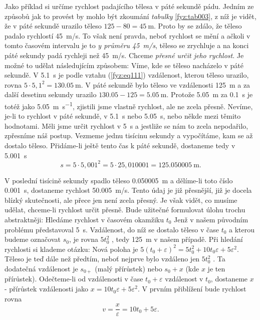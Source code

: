     Jako příklad si určíme rychlost padajícího tělesa v páté sekundě pádu. Jedním ze způsobů jak to 
    provést by mohlo být zkoumání \emph{tabulky} \ref{fyz:tab003}, z níž je vidět, že v páté 
    sekundě urazilo těleso \(125 - 80 = \SI{45}{\m}\). Proto by se zdálo, že těleso padalo 
    rychlostí \SI{45}{\m/\s}. To však není pravda, neboť rychlost se mění a ačkoli v tomto časovém 
    intervalu je to \emph{y průměru \SI{45}{\m/\s}}, těleso se zrychluje a na konci páté sekundy 
    padá rychleji než \SI{45}{\m/\s}. Chceme \emph{přesné určit jeho rychlost}. Je možné to udělat 
    následujícím způsobem: Víme, kde se těleso nacházelo v páté sekundě. V \SI{5.1}{\s} je podle 
    vztahu (\ref{fyz:eq111}) vzdálenost, kterou těleso urazilo, rovna \(5\cdot5,1^2 = \SI{130.05} 
    {\m}\). V páté sekundě bylo těleso ve vzdálenosti \SI{125}{\m} a za další desetinu sekundy 
    urazilo \(\num{130.05} - \num{125} = \SI{5.05}{\m}\). Protože \SI{5.05}{\m} za \SI{0.1}{\s} je 
    totéž jako \SI{5.05}{\m\per\s}, zjistili jsme vlastně rychlost, ale ne zcela přesně. Nevíme, 
    je-li to rychlost v páté sekundě, v \SI{5.1}{\s} nebo \SI{5.05}{\s}, nebo někde mezi těmito 
    hodnotami. Měli jsme určit rychlost v \SI{5}{\s} a jestliže se nám to zcela nepodařilo, 
    zpřesníme náš postup. Vezmeme jednu tisícinu sekundy a vypočítáme, kam se až dostalo těleso. 
    Přidáme-li ještě tento čas k páté sekundě, dostaneme tedy v \SI{5.001}{\s}
    \begin{equation*}
      s = 5\cdot5,001^2 = 5\cdot25,010001 = \SI{125.050005}{\m}.
    \end{equation*}
    
    V poslední tisícině sekundy spadlo těleso \SI{0.050005}{\m} a dělíme-li toto číslo 
    \SI{0.001}{\s}, dostaneme rychlost \SI{50.005}{\m/\s}. Tento údaj je již přesnější, již je 
    docela blízký skutečnosti, ale přece jen není zcela přesný. Je však vidět, co musíme udělat, 
    chceme-li rychlost určit přesně. Bude užitečné formulovat úlohu trochu abstraktněji: Hledáme 
    rychlost v časovém okamžiku \(t_0\) Jenž v našem původním problému představoval \SI{5}{\s}. 
    Vzdálenost, do níž se dostalo těleso v čase \(t_0\) a kterou budeme označovat \(s_0\), je rovna 
    \(5t_0^2\) , tedy \SI{125}{\m} v našem případě. Při hledání rychlosti si klademe otázku: 
     Nová poloha 
    je \(5(t_0 + \varepsilon)^2 = 5t_0^2 + 10t_0\varepsilon + 5\varepsilon^2\). Těleso je teď dále 
    než předtím, neboť nejprve bylo vzdáleno jen \(5t_0^2\) . Ta dodatečná vzdálenost je \(s_{0+}\) 
    (malý přírůstek) nebo \(s_0 + x\) (kde \(x\) je ten přírůstek). Odečteme-li od vzdálenosti 
    v čase \(t_0 + \varepsilon\) vzdálenost v \(t_0\), dostaneme \(x\) - přírůstek vzdálenosti jako 
    \(x = 10t_0\varepsilon +5\varepsilon^2\). V prvním přiblížení bude rychlost rovna
    \begin{equation}\label{fyz:eq116}
      v = \frac{x}{\varepsilon} = 10t_0 +5\varepsilon.
    \end{equation}
    
